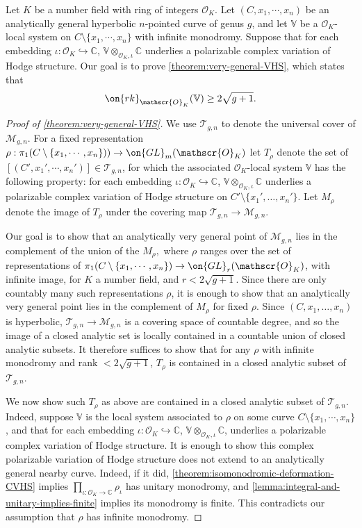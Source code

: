 Let $K$ be a number field with ring of integers
$\mathscr{O}_K$. Let $(C, x_1, \cdots, x_n)$ be an analytically general
hyperbolic $n$-pointed curve of genus $g$, and let $\mathbb{V}$ be a $\mathscr{O}_K$-local system on $C\setminus\{x_1, \cdots, x_n\}$ with infinite monodromy.
 Suppose that for each embedding $\iota: \mathscr{O}_K\hookrightarrow
 \mathbb{C}$, $\mathbb{V}\otimes_{\mathscr{O}_K, \iota}\mathbb{C}$ underlies a
 polarizable complex variation of Hodge structure. Our goal is to prove
 \autoref{theorem:very-general-VHS}, which states that $$\on{rk}_{\mathscr{O}_K}(\mathbb{V})\geq 2\sqrt{g+1}.$$

\begin{proof}[Proof of \autoref{theorem:very-general-VHS}]
	We use
	$\mathscr{T}_{g,n}$ to denote the universal cover of $\mathscr{M}_{g,n}$.
For a fixed representation
$\rho: \pi_1(C\setminus\{x_1, \cdots, x_n\}))\to \on{GL}_m(\mathscr{O}_K)$
let $T_\rho$ denote the set of $[(C', x_1', \cdots, x_n')]\in
\mathscr{T}_{g,n}$,
for which the associated $\mathscr O_K$-local system $\mathbb V$ has the
following property:
for each embedding $\iota: \mathscr{O}_K\hookrightarrow \mathbb{C}$,
$\mathbb{V}\otimes_{\mathscr{O}_K, \iota}\mathbb{C}$ underlies a polarizable
complex variation of Hodge structure on $C' \setminus \{x_1', \ldots, x_n'\}$.
Let $M_\rho$ denote the image of $T_\rho$ under the covering map
$\mathscr{T}_{g,n} \to \mathscr M_{g,n}$.

Our goal is to show that an analytically very general point of $\mathscr M_{g,n}$ lies in the complement of
the union of the $M_\rho,$ where $\rho$ ranges over the set of representations
of $\pi_1(C\setminus\{x_1, \cdots, x_n\})\to \on{GL}_r(\mathscr{O}_K)$, with
infinite image, for $K$ a number field, and $r<2\sqrt{g+1}$.
Since there are only countably many such representations $\rho$,
it is enough to show that an analytically very general point lies in the complement
of $M_\rho$ for fixed $\rho$.
Since $(C, x_1, \ldots, x_n)$ is hyperbolic,
$\mathscr{T}_{g,n} \to \mathscr M_{g,n}$
is a covering space of countable degree, and so the image of a closed analytic
set is locally contained in a countable union of closed analytic subsets.
It therefore suffices to show that for any $\rho$ with infinite monodromy and
rank $< 2 \sqrt{g+1}$, $T_\rho$ is contained in a closed analytic subset
of $\mathscr T_{g,n}$.

We now show such $T_\rho$ as above are contained in a closed analytic subset of
$\mathscr{T}_{g,n}$.
Indeed, suppose $\mathbb V$ is the local system associated to $\rho$ on some curve $C\setminus\{x_1, \cdots, x_n\}$, and that for each embedding $\iota: \mathscr{O}_K\hookrightarrow \mathbb{C}$, $\mathbb{V}\otimes_{\mathscr{O}_K, \iota} \mathbb{C}$, underlies a polarizable complex variation of Hodge structure.
It is enough to show this complex polarizable variation of Hodge structure does
not extend to an analytically general nearby curve.
Indeed, if it did,
\autoref{theorem:isomonodromic-deformation-CVHS} implies
$\prod_{\iota: \mathscr O_K \to \mathbb C} \rho_\iota$
has unitary monodromy,
and
\autoref{lemma:integral-and-unitary-implies-finite} implies its monodromy is
finite.
This contradicts our assumption that $\rho$ has infinite monodromy. \end{proof}

